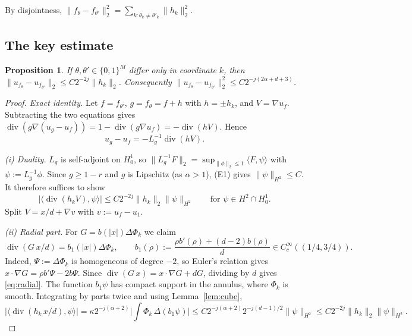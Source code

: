 \documentclass[11pt]{article}
\newtheorem{proposition}[theorem]{Proposition}
\theoremstyle{definition}
\theoremstyle{remark}
\newcommand{\dv}{\operatorname{div}}
\begin{document}
By disjointness, $\|f_\theta-f_{\theta'}\|_2^2=\sum_{k:\theta_k\ne\theta'_k}\|h_k\|_2^2$.

\subsection{The key estimate}

\begin{proposition}\label{prop:key}
If $\theta,\theta'\in\{0,1\}^M$ differ only in coordinate $k$, then $\|u_{f_\theta}-u_{f_{\theta'}}\|_2\le C2^{-2j}\|h_k\|_2$. Consequently
$\|u_{f_\theta}-u_{f_{\theta'}}\|_2^2\le C2^{-j(2\alpha+d+3)}$.
\end{proposition}

\begin{proof}
\emph{Exact identity.} Let $f=f_{\theta'}$, $g=f_\theta=f+h$ with $h=\pm h_k$, and $V=\nabla u_f$. Subtracting the two equations gives $\dv(g\nabla(u_g-u_f))=1-\dv(g\nabla u_f)=-\dv(hV)$. Hence
\[
u_g-u_f=-L_g^{-1}\dv(hV).
\]

\emph{(i) Duality.} $L_g$ is self-adjoint on $H^1_0$, so
$\|L_g^{-1}F\|_2=\sup_{\|\phi\|_2\le1}\langle F,\psi\rangle$ with $\psi:=L_g^{-1}\phi$.
Since $g\ge1-r$ and $g$ is Lipschitz (as $\alpha>1$), (E1) gives $\|\psi\|_{H^2}\le C$. It therefore suffices to show
\begin{equation}\label{eq:dual}
|\langle\dv(h_kV),\psi\rangle|\le C2^{-2j}\|h_k\|_2\|\psi\|_{H^2}\qquad\text{for }\psi\in H^2\cap H^1_0 .
\end{equation}
Split $V=x/d+\nabla v$ with $v:=u_f-u_1$.

\emph{(ii) Radial part.} For $G=b(|x|)\Delta\Phi_k$ we claim
\begin{equation}\label{eq:radial}
\dv(G\,x/d)=b_1(|x|)\Delta\Phi_k,\qquad b_1(\rho):=\frac{\rho b'(\rho)+(d-2)b(\rho)}{d}\in C^\infty_c((1/4,3/4)).
\end{equation}
Indeed, $\Psi:=\Delta\Phi_k$ is homogeneous of degree $-2$, so Euler's relation gives $x\cdot\nabla G=\rho b'\Psi-2b\Psi$.  Since $\dv(G\,x)=x\cdot\nabla G+dG$, dividing by $d$ gives \eqref{eq:radial}. The function $b_1\psi$ has compact support in the annulus, where $\Phi_k$ is smooth. Integrating by parts twice and using Lemma~\ref{lem:cube},
\[
|\langle\dv(h_k\,x/d),\psi\rangle|=\kappa2^{-j(\alpha+2)}\Big|\int\Phi_k\,\Delta(b_1\psi)\Big|\le C2^{-j(\alpha+2)}2^{-j(d-1)/2}\|\psi\|_{H^2}\le C2^{-2j}\|h_k\|_2\|\psi\|_{H^2}.
\]


\end{proof}
\end{document}
